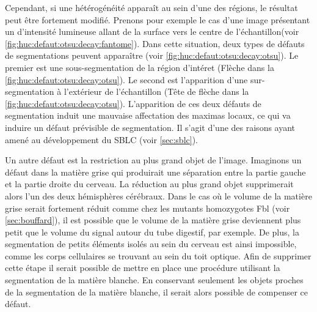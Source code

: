 \documentclass[\main/main.tex]{subfiles}
\begin{document}
%
Cependant, si une hétérogénéité apparaît au sein d'une des régions, le résultat peut être fortement modifié.
%
Prenons pour exemple le cas d'une image présentant un d'intensité lumineuse allant de la surface vers le centre de l'échantillon(voir \autoref{fig:huc:defaut:otsu:decay:fantome}).
%
Dans cette situation, deux types de défauts de segmentations peuvent apparaître (voir \autoref{fig:huc:defaut:otsu:decay:otsu}).
%
Le premier est une sous-segmentation de la région d'intéret (Flèche dans la \autoref{fig:huc:defaut:otsu:decay:otsu}).
%
Le second est l'apparition d'une sur-segmentation à l'extérieur de l'échantillon (Tête de flèche dans la \autoref{fig:huc:defaut:otsu:decay:otsu}).
%
L'apparition de ces deux défauts de segmentation induit une mauvaise affectation des maximas locaux, ce qui va induire un défaut prévisible de segmentation.
%
Il s'agit d'une des raisons ayant amené au développement du SBLC (voir \autoref{sec:sblc}). 

%
Un autre défaut est la restriction au plus grand objet de l'image.
%
Imaginons un défaut dans la matière grise qui produirait une séparation entre la partie gauche et la partie droite du cerveau.
%
La réduction au plus grand objet supprimerait alors l'un des deux hémisphères cérébraux.
%
Dans le cas où le volume de la matière grise serait fortement réduit comme chez les mutants homozygotes Fbl (voir \autoref{sec:bouffard}),
il est possible que le volume de la matière grise deviennent plus petit que le volume du signal autour du tube digestif, par exemple.
%
De plus, la segmentation de petits éléments isolés au sein du cerveau est ainsi impossible, comme les corps cellulaires se trouvant au sein du toit optique.
%
Afin de supprimer cette étape il serait possible de mettre en place une procédure utilisant la segmentation de la matière blanche.
%
En conservant seulement les objets proches de la segmentation de la matière blanche, il serait alors possible de compenser ce défaut.
\end{document}
